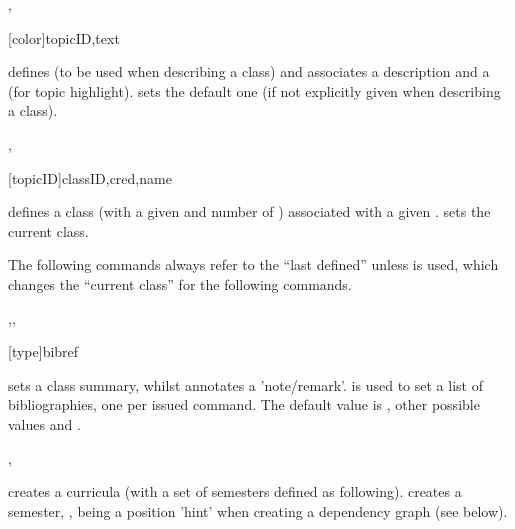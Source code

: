 \documentclass[article,nofontwarning,nogeometry,english,tocdepth=3,secdepth=3]{ufrgscca} %
\begin{document}
\begin{codedescribe}{\topicdef,}
\begin{codesyntax}%
    \tsmacro{\topicdef}[color]{topicID,text}
\end{codesyntax}
\tsmacro{\topicdef}{} defines  (to be used when describing a class) and associates a  description and a  (for topic highlight).  sets the default one (if not explicitly given when describing a class).
\end{codedescribe}


\begin{codedescribe}[code,update=2023/11/18]{\classdef,\classset}
    \begin{codesyntax}%
        \tsmacro{\classdef}[topicID]{classID,cred,name}
    \end{codesyntax}
\tsmacro{\classdef}{} defines a class  (with a given  and number of ) associated  with a given . \tsmacro{\classset}{} sets the current class.

The following commands always refer to the “last defined” \tsmacro{\classdef}{} unless \tsmacro{\setclass}{} is used, which changes the “current class” for the following commands.
\end{codedescribe}

\begin{codedescribe}[code,new=2023/11/18,update=2025/09/18]{\csummary,\classremark,\bibdef}
    \begin{codesyntax}%
        \tsmacro{\bibdef}[type]{bibref}
    \end{codesyntax}
    \tsobj{\csummary} sets a class summary, whilst \tsobj{\classremark} annotates a 'note/remark'. \tsobj{\bibdef}
 is used to set a list of bibliographies, one per issued command. The default  value is  , other possible values   and .
\end{codedescribe}



\begin{codedescribe}[code,update=2023/11/18]{\currdef,\semdef}
    \begin{codesyntax}%
    \end{codesyntax}
\tsobj{\currdef}  creates a curricula (with a set of semesters defined as following).
\tsobj{\semdef} creates a semester, ,  being a position 'hint' when creating a dependency graph (see below).
\end{codedescribe}
\end{document}
